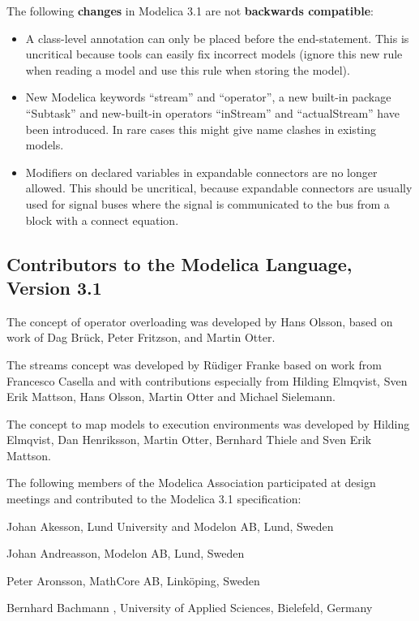 \documentclass[10pt,a4paper]{report}
\def\doublelabel#1{\label{#1}}
\begin{document}
The following \textbf{changes} in Modelica 3.1 are not \textbf{backwards
compatible}:

\begin{itemize}
\item
  A class-level annotation can only be placed before the end-statement.
  This is uncritical because tools can easily fix incorrect models
  (ignore this new rule when reading a model and use this rule when
  storing the model).
\item
  New Modelica keywords ``stream'' and ``operator'', a new built-in
  package ``Subtask'' and new-built-in operators ``inStream'' and
  ``actualStream'' have been introduced. In rare cases this might give
  name clashes in existing models.
\item
  Modifiers on declared variables in expandable connectors are no longer
  allowed. This should be uncritical, because expandable connectors are
  usually used for signal buses where the signal is communicated to the
  bus from a block with a connect equation.
\end{itemize}

\subsection{Contributors to the Modelica Language, Version 3.1}\doublelabel{contributors-to-the-modelica-language-version-3-1}

The concept of operator overloading was developed by Hans Olsson, based
on work of Dag Brück, Peter Fritzson, and Martin Otter.

The streams concept was developed by Rüdiger Franke based on work from
Francesco Casella and with contributions especially from Hilding
Elmqvist, Sven Erik Mattson, Hans Olsson, Martin Otter and Michael
Sielemann.

The concept to map models to execution environments was developed by
Hilding Elmqvist, Dan Henriksson, Martin Otter, Bernhard Thiele and Sven
Erik Mattson.

The following members of the Modelica Association participated at design
meetings and contributed to the Modelica 3.1 specification:

Johan Akesson, Lund University and Modelon AB, Lund, Sweden

Johan Andreasson, Modelon AB, Lund, Sweden

Peter Aronsson, MathCore AB, Linköping, Sweden

Bernhard Bachmann , University of Applied Sciences, Bielefeld, Germany
\end{document}
